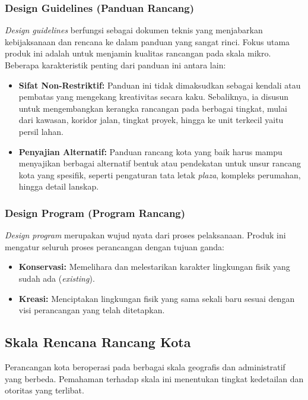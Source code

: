 \documentclass[../rumukota.tex]{subfiles}
\begin{document}
\subsubsection{Design Guidelines (Panduan Rancang)}
\textit{Design guidelines} berfungsi sebagai dokumen teknis yang menjabarkan kebijaksanaan dan rencana ke dalam panduan yang sangat rinci. Fokus utama produk ini adalah untuk menjamin kualitas rancangan pada skala mikro. Beberapa karakteristik penting dari panduan ini antara lain:
\begin{itemize}
	\item \textbf{Sifat Non-Restriktif:} Panduan ini tidak dimaksudkan sebagai kendali atau pembatas yang mengekang kreativitas secara kaku. Sebaliknya, ia disusun untuk mengembangkan kerangka rancangan pada berbagai tingkat, mulai dari kawasan, koridor jalan, tingkat proyek, hingga ke unit terkecil yaitu persil lahan.
	\item \textbf{Penyajian Alternatif:} Panduan rancang kota yang baik harus mampu menyajikan berbagai alternatif bentuk atau pendekatan untuk unsur rancang kota yang spesifik, seperti pengaturan tata letak \textit{plaza}, kompleks perumahan, hingga detail lanskap.
\end{itemize}

\subsubsection{Design Program (Program Rancang)}
\textit{Design program} merupakan wujud nyata dari proses pelaksanaan. Produk ini mengatur seluruh proses perancangan dengan tujuan ganda:
\begin{itemize}
	\item \textbf{Konservasi:} Memelihara dan melestarikan karakter lingkungan fisik yang sudah ada (\textit{existing}).
	\item \textbf{Kreasi:} Menciptakan lingkungan fisik yang sama sekali baru sesuai dengan visi perancangan yang telah ditetapkan.
\end{itemize}

\subsection{Skala Rencana Rancang Kota}
Perancangan kota beroperasi pada berbagai skala geografis dan administratif yang berbeda. Pemahaman terhadap skala ini menentukan tingkat kedetailan dan otoritas yang terlibat.
\end{document}
